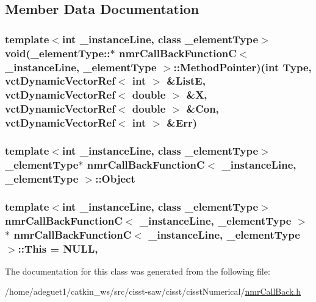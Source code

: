 \subsection{Member Data Documentation}
\hypertarget{classnmr_call_back_function_c_a59924530a7242156c291de2511329051}{
\subsubsection[{Method\-Pointer}]{\setlength{\rightskip}{0pt plus 5cm}template$<$int \-\_\-instance\-Line, class \-\_\-element\-Type$>$ void(\-\_\-element\-Type\-::$\ast$ {\bf nmr\-Call\-Back\-Function\-C}$<$ \-\_\-instance\-Line, \-\_\-element\-Type $>$\-::Method\-Pointer)(int Type, {\bf vct\-Dynamic\-Vector\-Ref}$<$ int $>$ \&List\-E, {\bf vct\-Dynamic\-Vector\-Ref}$<$ double $>$ \&X, {\bf vct\-Dynamic\-Vector\-Ref}$<$ double $>$ \&Con, {\bf vct\-Dynamic\-Vector\-Ref}$<$ int $>$ \&Err)\hspace{0.3cm}{\ttfamily [protected]}}}\label{classnmr_call_back_function_c_a59924530a7242156c291de2511329051}
\hypertarget{classnmr_call_back_function_c_ae7c7d06c6287e05a265c448de2f92693}{
\subsubsection[{Object}]{\setlength{\rightskip}{0pt plus 5cm}template$<$int \-\_\-instance\-Line, class \-\_\-element\-Type$>$ \-\_\-element\-Type$\ast$ {\bf nmr\-Call\-Back\-Function\-C}$<$ \-\_\-instance\-Line, \-\_\-element\-Type $>$\-::Object\hspace{0.3cm}{\ttfamily [protected]}}}\label{classnmr_call_back_function_c_ae7c7d06c6287e05a265c448de2f92693}
\hypertarget{classnmr_call_back_function_c_afbeb6bde7ebc567dc8627ec16475ef52}{
\subsubsection[{This}]{\setlength{\rightskip}{0pt plus 5cm}template$<$int \-\_\-instance\-Line, class \-\_\-element\-Type$>$ {\bf nmr\-Call\-Back\-Function\-C}$<$ \-\_\-instance\-Line, \-\_\-element\-Type $>$ $\ast$ {\bf nmr\-Call\-Back\-Function\-C}$<$ \-\_\-instance\-Line, \-\_\-element\-Type $>$\-::This = N\-U\-L\-L\hspace{0.3cm}{\ttfamily [static]}, {\ttfamily [protected]}}}\label{classnmr_call_back_function_c_afbeb6bde7ebc567dc8627ec16475ef52}


The documentation for this class was generated from the following file\-:\begin{DoxyCompactItemize}
\item 
/home/adeguet1/catkin\-\_\-ws/src/cisst-\/saw/cisst/cisst\-Numerical/\hyperlink{nmr_call_back_8h}{nmr\-Call\-Back.\-h}\end{DoxyCompactItemize}
